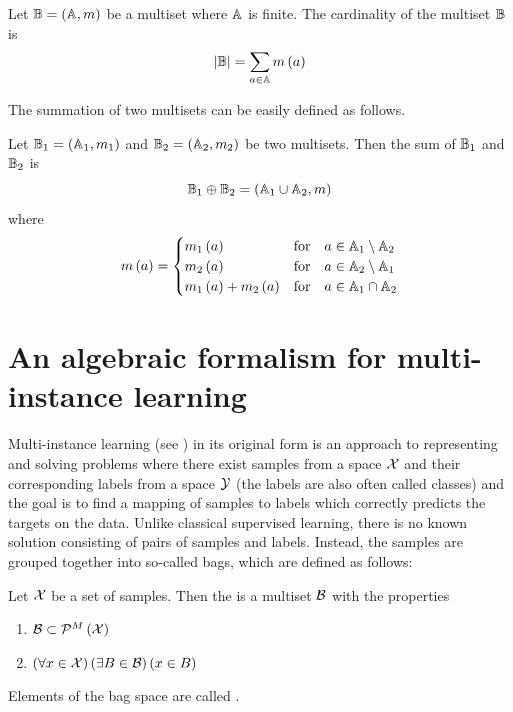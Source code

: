 \begin{define}
	Let \( \mathbb{B} = \left( \mathbb{A}, m \right) \) be a multiset where \( \mathbb{A} \) is finite. The cardinality of the multiset \( \mathbb{B} \) is
	\[ \left\lvert \mathbb{B} \right\rvert = \sum_{a \in \mathbb{A}} m \left( a \right) \]
\end{define}

The summation of two multisets can be easily defined as follows.

\begin{define}\label{def:multiset-sum}
	Let \( \mathbb{B}_1 = \left( \mathbb{A}_1, m_1 \right) \) and \( \mathbb{B}_2 = \left( \mathbb{A}_2, m_2 \right) \) be two multisets. Then the sum of \( \mathbb{B}_1 \) and \( \mathbb{B}_2 \) is
	\[ \mathbb{B}_1 \oplus \mathbb{B}_2 = \left( \mathbb{A}_1 \cup \mathbb{A}_2, m \right) \]
	where
	\[ m \left( a \right) = \begin{cases}
			m_1 \left( a \right) &\text{for} \quad a \in \mathbb{A}_1 \setminus \mathbb{A}_2 \\
			m_2 \left( a \right) &\text{for} \quad a \in \mathbb{A}_2 \setminus \mathbb{A}_1 \\
			m_1 \left( a \right) + m_2 \left( a \right) &\text{for} \quad a \in \mathbb{A}_1 \cap \mathbb{A}_2 \\
		\end{cases} \]
\end{define}

\section{An algebraic formalism for multi-instance learning}
Multi-instance learning (see \cite{dietterich_solving_1997}) in its original form is an approach to representing and solving problems where there exist samples from a space \( \mathcal{X} \) and their corresponding labels from a space \( \mathcal{Y} \) (the labels are also often called classes) and the goal is to find a mapping of samples to labels which correctly predicts the targets on the data. Unlike classical supervised learning, there is no known solution consisting of pairs of samples and labels. Instead, the samples are grouped together into so-called bags, which are defined as follows:

\begin{define}
	Let \( \mathcal{X} \) be a set of samples. Then the  is a multiset \( \mathcal{B} \) with the properties
	\begin{enumerate}
		\item \( \mathcal{B} \subset \mathcal{P}^M \left( \mathcal{X} \right) \)
		\item \( \left( \forall x \in \mathcal{X} \right) \left( \exists B \in \mathcal{B} \right) \left( x \in B \right) \)
	\end{enumerate}
	Elements of the bag space are called .
\end{define}

